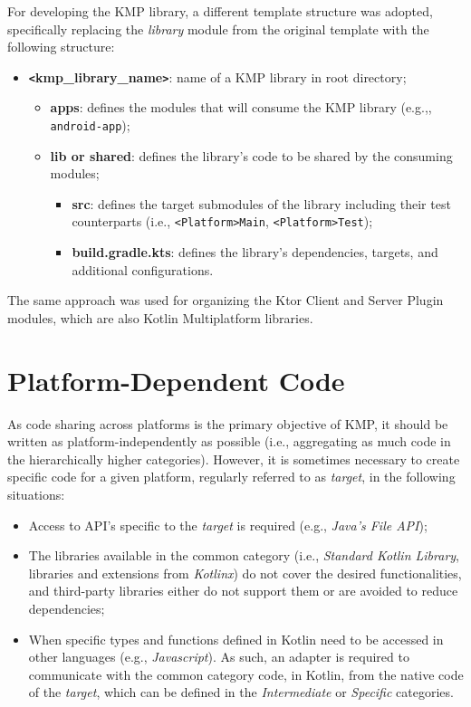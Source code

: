 For developing the KMP library, a different template structure was adopted, specifically replacing the \textit{library} module from the original template with the following structure:

\begin{itemize}
    \item \textbf{\texttt{<}kmp\_library\_name\texttt{>}}: name of a KMP library in root directory;
    \begin{itemize}
        \item \textbf{apps}: defines the modules that will consume the KMP library (e.g.,, \texttt{android-app});
        \item \textbf{lib or shared}: defines the library's code to be shared by the consuming modules;
        \begin{itemize}
            \item \textbf{src}: defines the target submodules of the library including their test counterparts (i.e., \texttt{<Platform>Main}, \texttt{<Platform>Test});
            \item \textbf{build.gradle.kts}: defines the library's dependencies, targets, and additional configurations.
        \end{itemize}
    \end{itemize}
\end{itemize}

The same approach was used for organizing the Ktor Client and Server Plugin modules, which are also Kotlin Multiplatform libraries.


\section{Platform-Dependent Code}\label{sec:platform-dependent-code}

As code sharing across platforms is the primary objective of KMP, it should be written as platform-independently as possible (i.e., aggregating as much code in the hierarchically higher categories).
However, it is sometimes necessary to create specific code for a given platform, regularly referred to as \textit{target}, in the following situations:

\begin{itemize}
    \item Access to API's specific to the \textit{target} is required (e.g., \textit{Java's File API});
    \item The libraries available in the common category (i.e., \textit{Standard Kotlin Library}, libraries and extensions from \textit{Kotlinx}) do not cover the desired functionalities, and third-party libraries either do not support them or are avoided to reduce dependencies;
    \item When specific types and functions defined in Kotlin need to be accessed in other languages (e.g., \textit{Javascript}).
    As such, an adapter is required to communicate with the common category code,
    in Kotlin, from the native code of the \textit{target}, which can be defined in the \textit{Intermediate} or \textit{Specific} categories.
\end{itemize}

